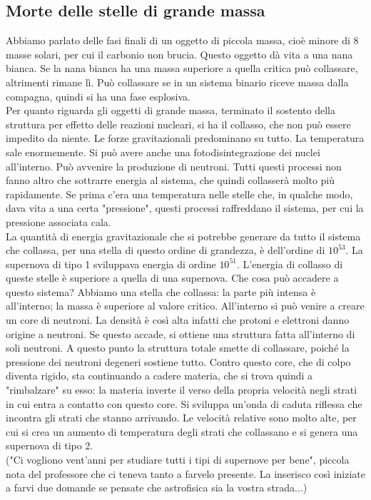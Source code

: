\documentclass[a4paper,11pt]{article}
\begin{document}
\subsection{Morte delle stelle di grande massa}
Abbiamo parlato delle fasi finali di un oggetto di piccola massa, cioè minore di 8 masse solari, per cui il carbonio non brucia. Questo oggetto dà vita a una nana bianca. Se la nana bianca ha una massa superiore a quella critica può collassare, altrimenti rimane lì. Può collassare se in un sistema binario riceve massa dalla compagna, quindi si ha una fase esplosiva. \\ Per quanto riguarda gli oggetti di grande massa, terminato il sostento della struttura per effetto delle reazioni nucleari, si ha il collasso, che non può essere impedito da niente. Le forze gravitazionali predominano su tutto. La temperatura sale enormemente. Si può avere anche una fotodisintegrazione dei nuclei all'interno. Può avvenire la produzione di  neutroni. Tutti questi processi non fanno altro che sottrarre energia al sistema, che quindi collasserà molto più rapidamente. Se prima c'era una temperatura nelle stelle che, in qualche modo, dava vita a una certa "pressione", questi processi raffreddano il sistema, per cui la pressione associata cala.\\ La quantità di energia gravitazionale che si potrebbe generare da tutto il sistema che collassa, per una stella di questo ordine di grandezza, è dell'ordine di $10^{53}$. La supernova di tipo 1 sviluppava energia di ordine $10^{51}$. L'energia di collasso di queste stelle è superiore a quella di una supernova. Che cosa può accadere a questo sistema? Abbiamo una stella che collassa: la parte più intensa è all'interno; la massa è superiore al valore critico. All'interno si può venire a creare un core di neutroni. La densità è così alta infatti che protoni e elettroni danno origine a neutroni. Se questo accade, si ottiene una struttura fatta all'interno di soli neutroni. A questo punto la struttura totale smette di collassare, poiché la pressione dei neutroni degeneri sostiene tutto. Contro questo core, che di colpo diventa rigido, sta continuando a cadere materia, che si trova quindi a "rimbalzare" su esso: la materia inverte il verso della propria velocità negli strati in cui entra a contatto con questo core. Si sviluppa un'onda di caduta riflessa che incontra gli strati che stanno arrivando. Le velocità relative sono molto alte, per cui si crea un aumento di temperatura degli strati che collassano e si genera una supernova di tipo 2. \\("Ci vogliono vent'anni per studiare tutti i tipi di supernove per bene", piccola nota del professore che ci teneva tanto a farvelo presente. La inserisco così iniziate a farvi due domande se pensate che astrofisica sia la vostra strada...)\\ 
\end{document}
